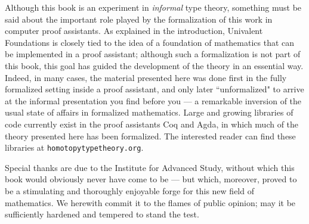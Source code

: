 {Although this book is an experiment in \emph{informal} type theory, something must be said about the important role played by the formalization of this work in computer proof assistants.  As explained in the introduction, Univalent Foundations is closely tied to the idea of a foundation of mathematics that can be implemented in a proof assistant; although such a formalization is not part of this book, this goal has guided the development of the theory in an essential way. Indeed, in many cases, the material presented here was done first in the fully formalized setting inside a proof assistant, and only later ``unformalized" to arrive at the informal presentation you find before you --- a remarkable inversion of the usual state of affairs in formalized mathematics.   Large and growing libraries of code currently exist in the proof assistants Coq and Agda, in which much of the theory presented here has been formalized.  The interested reader can find these libraries at {\tt homotopytypetheory.org}.

Special thanks are due to the Institute for Advanced Study, without which this book would obviously never have come to be --- but which, moreover, proved to be a stimulating and thoroughly enjoyable forge for this new field of mathematics.  We herewith commit it to the flames of public opinion; may it be sufficiently hardened and tempered to stand the test. 

\bigskip



}

